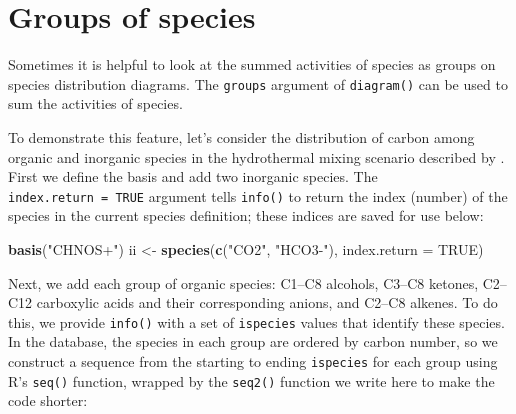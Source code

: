 \documentclass[]{tufte-book}
\newenvironment{Shaded}{}{}
\newcommand{\KeywordTok}[1]{\textcolor[rgb]{0.00,0.44,0.13}{\textbf{#1}}}
\newcommand{\DataTypeTok}[1]{\textcolor[rgb]{0.56,0.13,0.00}{#1}}
\newcommand{\StringTok}[1]{\textcolor[rgb]{0.25,0.44,0.63}{#1}}
\newcommand{\OtherTok}[1]{\textcolor[rgb]{0.00,0.44,0.13}{#1}}
\newcommand{\NormalTok}[1]{#1}
\begin{document}
\section{Groups of species}\label{groups-of-species}

Sometimes it is helpful to look at the summed activities of species as
groups on species distribution diagrams. The \texttt{groups} argument of
{\texttt{diagram()}} can be used to sum the activities of species.

To demonstrate this feature, let's consider the distribution of carbon
among organic and inorganic species in the hydrothermal mixing scenario
described by \citet{SS98}. First we define the basis and add two
inorganic species. The \texttt{index.return\ =\ TRUE} argument tells
{\texttt{info()}} to return the index (number) of the species in the
current species definition; these indices are saved for use below:

\begin{Shaded}
\begin{Highlighting}[]
\KeywordTok{basis}\NormalTok{(}\StringTok{"CHNOS+"}\NormalTok{)}
\NormalTok{ii <-}\StringTok{ }\KeywordTok{species}\NormalTok{(}\KeywordTok{c}\NormalTok{(}\StringTok{"CO2"}\NormalTok{, }\StringTok{"HCO3-"}\NormalTok{), }\DataTypeTok{index.return =} \OtherTok{TRUE}\NormalTok{)}
\end{Highlighting}
\end{Shaded}

Next, we add each group of organic species: C1--C8 alcohols, C3--C8
ketones, C2--C12 carboxylic acids and their corresponding anions, and
C2--C8 alkenes. To do this, we provide {\texttt{info()}} with a set of
\texttt{ispecies} values that identify these species. In the database,
the species in each group are ordered by carbon number, so we construct
a sequence from the starting to ending \texttt{ispecies} for each group
using R's \texttt{seq()} function, wrapped by the \texttt{seq2()}
function we write here to make the code shorter:
\end{document}
